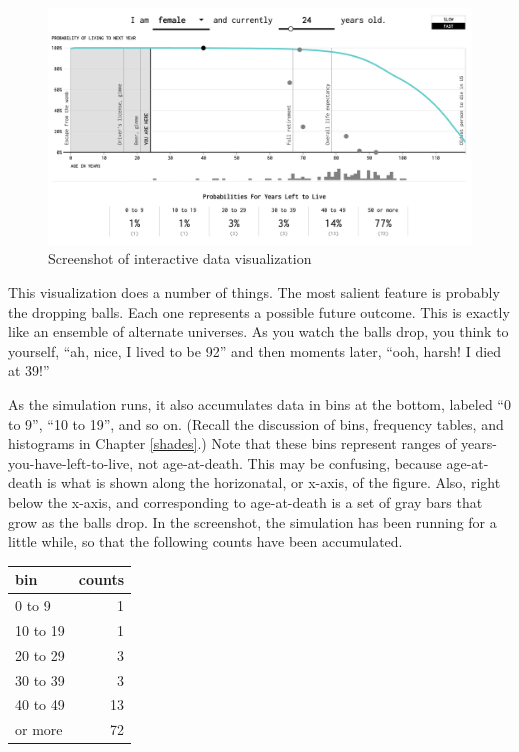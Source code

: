 \documentclass[openany]{book}
\begin{document}
\begin{figure}[H]

{\centering \includegraphics[width=0.9\linewidth,]{images/YYHLTLScreenshot1} 

}

\caption{Screenshot of interactive data visualization}\label{fig:years-screen}
\end{figure}

This visualization does a number of things. The most salient feature is probably the dropping balls. Each one represents a possible future outcome. This is exactly like an ensemble of alternate universes. As you watch the balls drop, you think to yourself, ``ah, nice, I lived to be 92'' and then moments later, ``ooh, harsh! I died at 39!''

As the simulation runs, it also accumulates data in bins at the bottom, labeled ``0 to 9'', ``10 to 19'', and so on. (Recall the discussion of bins, frequency tables, and histograms in Chapter \ref{shades}.) Note that these bins represent ranges of years-you-have-left-to-live, not age-at-death. This may be confusing, because age-at-death is what is shown along the horizonatal, or x-axis, of the figure. Also, right below the x-axis, and corresponding to age-at-death is a set of gray bars that grow as the balls drop. In the screenshot, the simulation has been running for a little while, so that the following counts have been accumulated.

\begin{table}[!h]
\centering\begin{table}[H]
\centering
\begin{tabular}{lr}
\toprule
bin & counts\\
\midrule
0 to 9 & 1\\
10 to 19 & 1\\
20 to 29 & 3\\
30 to 39 & 3\\
40 to 49 & 13\\
\addlinespace
50 or more & 72\\
\bottomrule
\end{tabular}
\end{table}
\end{table}
\end{document}
